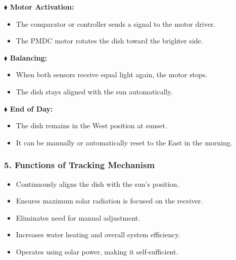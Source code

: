 \noindent
{\fontsize{10.2}{14.5}\selectfont
\textbf{$\blacklozenge$ Motor Activation:}
\begin{itemize}[leftmargin=6mm, itemsep=1.5mm, label=\textbullet]
  \item The comparator or controller sends a signal to the motor driver.
  \item The PMDC motor rotates the dish toward the brighter side.
\end{itemize}

\vspace{2mm}
\textbf{$\blacklozenge$ Balancing:}
\begin{itemize}[leftmargin=6mm, itemsep=1.5mm, label=\textbullet]
  \item When both sensors receive equal light again, the motor stops.
  \item The dish stays aligned with the sun automatically.
\end{itemize}

\vspace{2mm}
\textbf{$\blacklozenge$ End of Day:}
\begin{itemize}[leftmargin=6mm, itemsep=1.5mm, label=\textbullet]
  \item The dish remains in the West position at sunset.
  \item It can be manually or automatically reset to the East in the morning.
\end{itemize}
}

\vspace{4mm}
\subsubsection*{5. Functions of Tracking Mechanism}
\begin{itemize}[leftmargin=8mm, itemsep=2mm, label=\textbullet]
  \item Continuously aligns the dish with the sun's position.
  \item Ensures maximum solar radiation is focused on the receiver.
  \item Eliminates need for manual adjustment.
  \item Increases water heating and overall system efficiency.
  \item Operates using solar power, making it self-sufficient.
\end{itemize}

